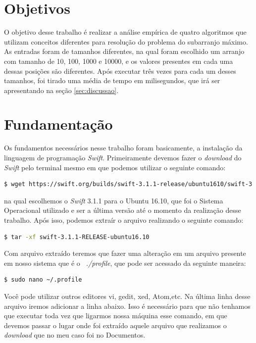 \documentclass[
	12pt,				%
	oneside,   	        %
	a4paper,			%
	english,			%
	french,				%
	spanish,			%
	brazil,				%
	]{pacotes/abntex2}
\begin{document}
\section{Objetivos}
\label{sec:objetivos}
O objetivo desse trabalho é realizar a análise empírica de quatro algoritmos que utilizam conceitos diferentes para resolução do problema do subarranjo máximo. As entradas foram de tamanhos diferentes, na qual foram escolhido um arranjo com tamanho de 10, 100, 1000 e 10000, e os valores presentes em cada uma dessas posições são diferentes. Após executar três vezes para cada um desses tamanhos, foi tirado uma média de tempo em milisegundos, que irá ser apresentando na seção \ref{sec:discussao}.

\section{Fundamentação}
\label{sec:fundamentacao}
Os fundamentos necessários nesse trabalho foram basicamente, a instalação da linguagem de programação \textit{Swift}. Primeiramente devemos fazer o \textit{download} do \textit{Swift} pelo terminal mesmo em que podemos utilizar o seguinte comando:


\begin{lstlisting}[language=bash]
  $ wget https://swift.org/builds/swift-3.1.1-release/ubuntu1610/swift-3.1.1-RELEASE/swift-3.1.1-RELEASE-ubuntu16.10.tar.gz
\end{lstlisting}

na qual escolhemos o \textit{Swift} 3.1.1 para o Ubuntu 16.10, que foi o Sistema Operacional utilizado e ser a última versão até o momento da realização desse trabalho. Após isso, podemos extraír o arquivo realizando o seguinte comando:

\begin{lstlisting}[language=bash]
  $ tar -xf swift-3.1.1-RELEASE-ubuntu16.10
\end{lstlisting}

Com arquivo extraído teremos que fazer uma alteração em um arquivo presente em nosso sistema que é o \textit{~./profile}, que pode ser acessado da seguinte maneira:

\begin{lstlisting}[language=bash]
  $ sudo nano ~/.profile
\end{lstlisting}

Você pode utilizar outros editores vi, gedit, xed, Atom,etc. Na última linha desse arquivo iremos adicionar a linha abaixo. Isso é necessário para que não tenhamos que executar toda vez que ligarmos nossa máquina esse comando, em que devemos passar o lugar onde foi extraído aquele arquivo que realizamos o \textit{download} que no meu caso foi no Documentos.
\end{document}
